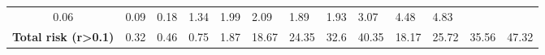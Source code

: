 \begin{table}[H]
{\begin{tabular}{cllll|llll|llll}
            0.06                                               &
            0.09                                               &
            0.18                                               &
            1.34                                               &
            1.99                                               &
            2.09                                               &
            1.89                                               &
            1.93                                               &
            3.07                                               &
            4.48                                               &
            4.83                                                 \\
            \textbf{Total risk (r\textgreater{}0.1)}           &
            0.32                                               &
            0.46                                               &
            0.75                                               &
            1.87                                               &
            18.67                                              &
            24.35                                              &
            32.6                                               &
            40.35                                              &
            18.17                                              &
            25.72                                              &
            35.56                                              &
            47.32                                                \\ \hline
        \end{tabular}%
    }
\end{table}

